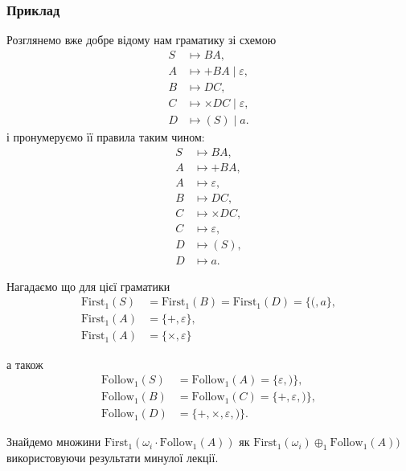 \subsubsection{Приклад}

Розглянемо вже добре відому нам граматику зі схемою
\begin{align*}
	S &\mapsto BA, \\
	A &\mapsto +BA \mid \varepsilon, \\
	B &\mapsto DC, \\
	C &\mapsto \times DC \mid \varepsilon, \\
	D &\mapsto (S) \mid a.
\end{align*}
і пронумеруємо її правила таким чином:
\setcounter{equation}{0}
\begin{align}
	S &\mapsto BA, \\
	A &\mapsto +BA, \\
	A &\mapsto \varepsilon, \\
	B &\mapsto DC, \\
	C &\mapsto \times DC, \\
	C &\mapsto \varepsilon, \\
	D &\mapsto (S), \\
	D &\mapsto a.
\end{align}

Нагадаємо що для цієї граматики
\begin{equation}
    \begin{aligned}
        \text{First}_1 (S) &= \text{First}_1 (B) = \text{First}_1 (D) = \{(, a\}, \\
        \text{First}_1 (A) &= \{+, \varepsilon\}, \\
        \text{First}_1 (A) &= \{\times, \varepsilon\}
    \end{aligned}
\end{equation}

а також 
\begin{equation}
    \begin{aligned}
        \text{Follow}_1 (S) &= \text{Follow}_1 (A) = \{ \varepsilon, )\}, \\
        \text{Follow}_1 (B) &= \text{Follow}_1 (C) = \{+, \varepsilon, )\}, \\
        \text{Follow}_1 (D) &= \{+, \times, \varepsilon, )\}.    
    \end{aligned}
\end{equation}

Знайдемо множини $\text{First}_1(\omega_i \cdot \text{Follow}_1 (A))$ як $\text{First}_1(\omega_i) \oplus_1 \text{Follow}_1 (A))$ використовуючи результати минулої лекції. \medskip

